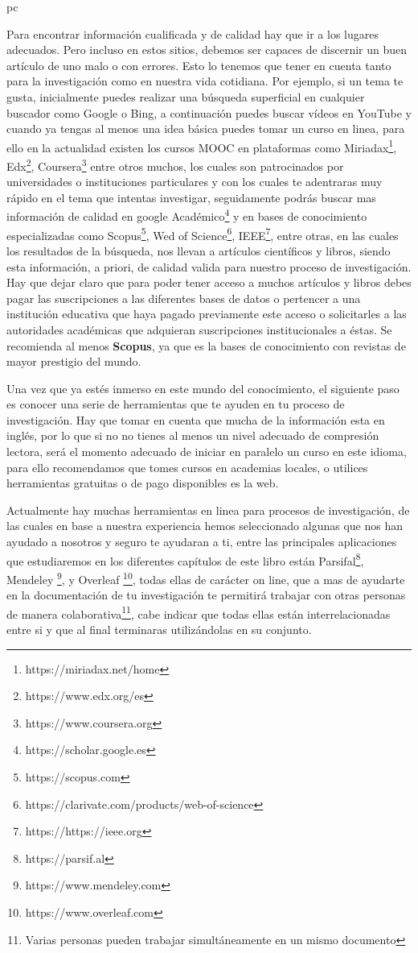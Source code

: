 pc\documentclass[a4paper,12pt,openany]{book}
\begin{document}
Para encontrar información cualificada y de calidad hay que ir a los lugares adecuados. Pero incluso en estos sitios, debemos ser capaces de discernir un buen artículo de uno malo o con errores. Esto lo tenemos que tener en cuenta tanto para la investigación como en nuestra vida cotidiana. Por ejemplo, si un tema te gusta, inicialmente puedes realizar una búsqueda superficial en cualquier buscador como Google o Bing, a continuación puedes buscar vídeos en YouTube y cuando ya tengas al menos una idea básica puedes tomar un curso en linea, para ello en la actualidad existen los cursos MOOC en plataformas como Miriadax\footnote{https://miriadax.net/home}, Edx\footnote{https://www.edx.org/es}, Coursera\footnote{https://www.coursera.org} entre otros muchos, los cuales son patrocinados por universidades o instituciones particulares y con los cuales te adentraras muy rápido en el tema que intentas investigar, seguidamente podrás buscar mas información de calidad en google Académico\footnote{https://scholar.google.es} y en bases de conocimiento especializadas como Scopus\footnote{https://scopus.com}, Wed of Science\footnote{https://clarivate.com/products/web-of-science}, IEEE\footnote{https://https://ieee.org}, entre otras, en las cuales los resultados de la búsqueda, nos llevan a artículos científicos y libros, siendo esta información, a priori, de calidad valida para nuestro proceso de investigación. Hay que dejar claro que para poder tener acceso a muchos  artículos y libros debes pagar las suscripciones a las diferentes bases de datos o pertencer a una institución educativa que haya pagado previamente este acceso o solicitarles a las autoridades académicas que adquieran suscripciones institucionales a éstas. Se recomienda al menos \textbf{Scopus}, ya que es la bases de conocimiento con revistas de mayor prestigio del mundo.

Una vez que ya estés inmerso en este mundo del conocimiento, el siguiente paso es conocer una serie de herramientas que te ayuden en tu proceso de investigación. Hay que tomar en cuenta que mucha de la información esta en inglés, por lo que si no no tienes al menos un nivel adecuado de compresión lectora, será el momento adecuado de iniciar en paralelo un curso en este idioma, para ello recomendamos que tomes cursos en academias locales, o utilices herramientas gratuitas o de pago disponibles es la web.

Actualmente hay muchas herramientas en linea para procesos de investigación, de las cuales en base a nuestra experiencia hemos seleccionado algunas que nos han ayudado a nosotros y seguro te ayudaran a ti, entre las principales aplicaciones que  estudiaremos en los diferentes capítulos de este libro están Parsifal\footnote{https://parsif.al}, Mendeley \footnote{https://www.mendeley.com}, y Overleaf \footnote{https://www.overleaf.com}, todas ellas de carácter on line, que a mas de ayudarte en la documentación de tu investigación te permitirá trabajar con otras personas de manera colaborativa\footnote{Varias personas pueden trabajar simultáneamente en un mismo documento},  cabe indicar que todas ellas están interrelacionadas entre si y que al final terminaras utilizándolas en su conjunto. 
\end{document}
